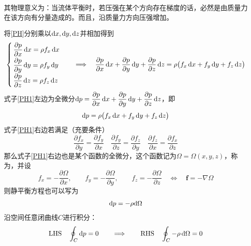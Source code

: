 其物理意义为：当流体平衡时，若压强在某个方向存在梯度的话，必然是由质量力在该方向有分量造成的。而且，沿质量力方向压强增加。

将\eqref{PH}分别乘以${\rm{d}} x, {\rm{d}} y, {\rm{d}} z$并相加得到
\begin{equation}
	\begin{cases}
		\, \dfrac{\partial p}{\partial x}\,{\rm{d}} x = \rho f_x \, {\rm{d}} x\\[0.5em]
		\, \dfrac{\partial p}{\partial y} \, {\rm{d}} y= \rho f_y \, {\rm{d}} y\\[0.5em]
		\, \dfrac{\partial p}{\partial z}\, {\rm{d}} z = \rho f_z \, {\rm{d}} z
	\end{cases}
	\quad \Longrightarrow \quad 
	\dfrac{\partial p}{\partial x}\,{\rm{d}} x + \dfrac{\partial p}{\partial y} \, {\rm{d}} y + \dfrac{\partial p}{\partial z}\, {\rm{d}} z = \rho \big(f_x \, {\rm{d}} x + f_y \, {\rm{d}} y + f_z \, {\rm{d}} z\big)
	\label{PH1}
\end{equation}
式子\eqref{PH1}左边为全微分${\rm{d}} p = \dfrac{\partial p}{\partial x}\,{\rm{d}} x + \dfrac{\partial p}{\partial y} \, {\rm{d}} y + \dfrac{\partial p}{\partial z}\, {\rm{d}} z$，即
\begin{equation}
	{\rm{d}} p = \rho \big(f_x \, {\rm{d}} x + f_y \, {\rm{d}} y + f_z \, {\rm{d}} z\big)
\end{equation}
式子\eqref{PH1}右边若满足（充要条件）
\begin{equation}
	\dfrac{\partial f_x}{\partial y} = \dfrac{\partial f_y}{\partial x} \quad \dfrac{\partial f_y}{\partial z} = \dfrac{\partial f_z}{\partial y} \quad \dfrac{\partial f_z}{\partial x} = \dfrac{\partial f_x}{\partial z} 
\end{equation}
那么式子\eqref{PH1}右边也是某个函数的全微分，这个函数记为$\Omega = \Omega(x,y,z)$，称为，并设
\begin{equation*}
	f_x = - \dfrac{\partial \Omega}{\partial x}, \qquad f_y = - \dfrac{\partial \Omega}{\partial y}, \qquad f_z = - \dfrac{\partial \Omega}{\partial z} \quad \Longleftrightarrow \quad \bm{f} = - \nabla \Omega
\end{equation*}
则静平衡方程也可以写为
\begin{equation}
	{\rm{d}} p = - \rho {\rm{d}} \Omega
	\label{压强静平衡方程}
\end{equation}
沿空间任意闭曲线$C$进行积分：
\begin{equation}
	\text{LHS} \quad \oint_{C} {\rm{d}} p = 0 \qquad \Longrightarrow \qquad \text{RHS} \quad \oint_{C} - \rho \, {\rm{d}} \Omega = 0
\end{equation}

